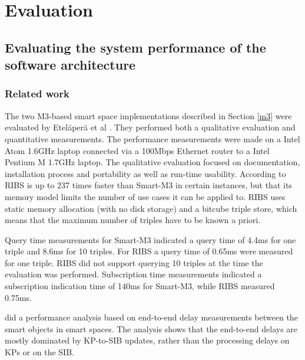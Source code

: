 \chapter{Evaluation}
\label{Evaluation}

\section{Evaluating the system performance of the software architecture}

\subsection{Related work}
The two M3-based smart space implementations described in Section \ref{m3} were evaluated by Etel\"aper\"a et al \cite{Etelapera2011}. They performed both a qualitative evaluation and quantitative measurements. The performance measurements were made on a Intel Atom 1.6GHz laptop connected via a 100Mbps Ethernet router to a Intel Pentium M 1.7GHz laptop. The qualitative evaluation focused on documentation, installation process and portability as well as run-time usability. According to \cite{Etelapera2011} RIBS is up to 237 times faster than Smart-M3 in certain instances, but that its memory model limits the number of use cases it can be applied to. RIBS uses static memory allocation (with no disk storage) and a bitcube triple store, which means that the maximum number of triples have to be known a priori.

Query time measurements for Smart-M3 indicated a query time of 4.4ms for one triple and 8.6ms for 10 triples. For RIBS a query time of 0.65ms were measured for one triple. RIBS did not support querying 10 triples at the time the evaluation was performed. Subscription time measurements indicated a subscription indication time of 140ms for Smart-M3, while RIBS measured 0.75ms.

\cite{Bhardwaj2011} did a performance analysis based on end-to-end delay measurements between the smart objects in smart spaces. The analysis shows that the end-to-end delays are mostly dominated by KP-to-SIB updates, rather than the processing delays on KPs or on the SIB.


